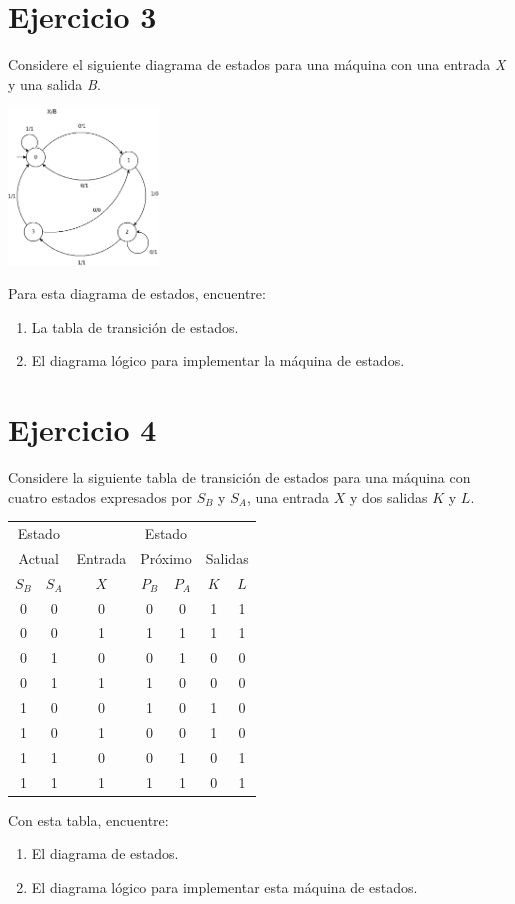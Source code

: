 \documentclass[letterpaper,12pt]{IEEEtran}
\begin{document}
\section*{Ejercicio 3}

Considere el siguiente diagrama de estados para una máquina con una entrada \textit{X} y una salida \textit{B}.

\begin{center}
\includegraphics[width=0.3\textwidth]{FSM3}
\end{center}

Para esta diagrama de estados, encuentre:
\begin{enumerate}
	\item La tabla de transición de estados.
	\item El diagrama lógico para implementar la máquina de estados.
\end{enumerate}

\section*{Ejercicio 4}

Considere la siguiente tabla de transición de estados para una máquina con cuatro estados expresados por $S_B$ y $S_A$, una entrada $X$ y dos salidas $K$ y $L$.

\begin{center}
\begin{tabular}{cc|c|cc|cc}
\multicolumn{2}{c|}{Estado} & & \multicolumn{2}{c|}{Estado} & \multicolumn{2}{c}{}\\

\multicolumn{2}{c|}{Actual} & Entrada &
\multicolumn{2}{c|}{Próximo} & \multicolumn{2}{c}{Salidas}\\
 $S_B$ & $S_A$ & $X$ & $P_B$ & $P_A$ & $K$ & $L$ \\\hline
0 & 0 & 0 & 0 & 0 & 1 & 1 \\
0 & 0 & 1 & 1 & 1 & 1 & 1 \\
0 & 1 & 0 & 0 & 1 & 0 & 0 \\
0 & 1 & 1 & 1 & 0 & 0 & 0 \\
1 & 0 & 0 & 1 & 0 & 1 & 0 \\
1 & 0 & 1 & 0 & 0 & 1 & 0 \\
1 & 1 & 0 & 0 & 1 & 0 & 1 \\
1 & 1 & 1 & 1 & 1 & 0 & 1 \\
\end{tabular}
\end{center}

Con esta tabla, encuentre:
\begin{enumerate}
	\item El diagrama de estados.
	\item El diagrama lógico para implementar esta máquina de estados.
\end{enumerate}
\end{document}
